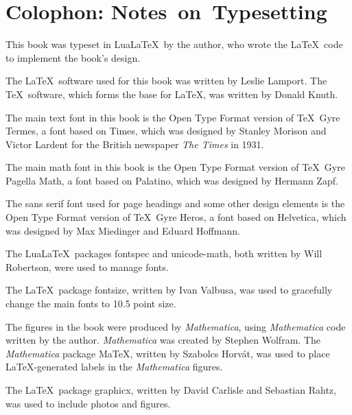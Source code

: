 \chapter{Colophon: Notes~on~Typesetting}

\vspace{-5.5bp}

\begin{Itemize}

\item
This book was typeset in Lua\LaTeX\ by the author, who wrote the \LaTeX\ code to implement the book's design.

\item
The \LaTeX\ software used for this book was written by Leslie Lamport. The \TeX\ software, which forms the base for \LaTeX, was written by Donald Knuth.

\item
The main text font in this book is the Open Type Format  version of \TeX\ Gyre Termes, a font based on Times,
which was designed by Stanley Morison and Victor Lardent for the British newspaper \emph{The Times} in 1931.

\item
The main math font in this book is the Open Type Format version of \TeX\ Gyre Pagella Math, a font based on Palatino, which was designed by Hermann Zapf.

\item
The sans serif font used for page headings and some other design elements is the Open Type Format version of \TeX\ Gyre Heros, a font based on Helvetica, which was designed by Max Miedinger and Eduard Hoffmann.

\item
The Lua\LaTeX\ packages \textsf{fontspec} and \textsf{unicode-math}, both written by Will Robertson, were used to manage fonts.

\item
The \LaTeX\ package \textsf{fontsize}, written by Ivan Valbusa, was used to gracefully change the main fonts to 10.5 point size.

\item
The figures in the book were produced by \textit{Mathematica}, using \textit{Mathematica} code written by the author. \textit{Mathematica} was created by Stephen Wolfram.
The \textit{Mathematica} package \textsf{MaTeX}, written by Szabolcs Horv\'at, was used to place \LaTeX-generated labels in the \textit{Mathematica} figures.

\item
The \LaTeX\ package \textsf{graphicx}, written by David Carlisle and Sebastian Rahtz, was used to include photos  and figures.


\end{Itemize}
